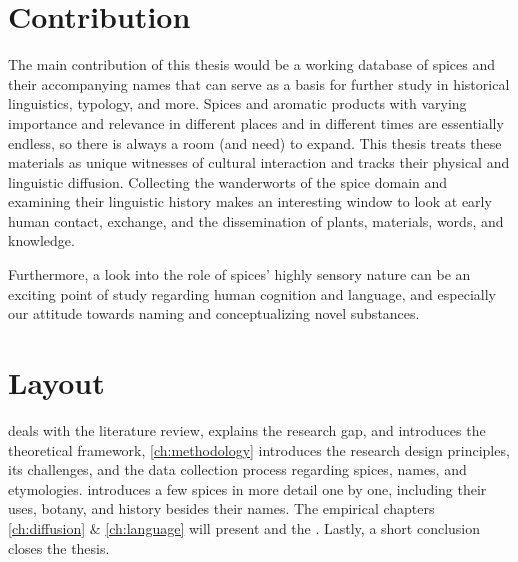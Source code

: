 \section{Contribution}

The main contribution of this thesis would be a working database of spices and their accompanying names that can serve as a basis for further study in historical linguistics, typology, and more. Spices and aromatic products with varying importance and relevance in different places and in different times are essentially endless, so there is always a room (and need) to expand. This thesis treats these materials as unique witnesses of cultural interaction and tracks their physical and linguistic diffusion. Collecting the \glspl{wanderwort} of the spice domain and examining their linguistic history makes an interesting window to look at early human contact, exchange, and the dissemination of plants, materials, words, and knowledge.

Furthermore, a look into the role of spices' highly sensory nature can be an exciting point of study regarding human cognition and language, and especially our attitude towards naming and conceptualizing novel substances.





\section{Layout}

  deals with the literature review, explains the research gap, and introduces the theoretical framework, \cref{ch:methodology}  introduces the research design principles, its challenges, and the data collection process regarding spices, names, and etymologies.   introduces a few spices in more detail one by one, including their uses, botany, and history besides their names. The empirical chapters \cref{ch:diffusion} \& \cref{ch:language} will present  and the . Lastly, a short conclusion closes the thesis.










